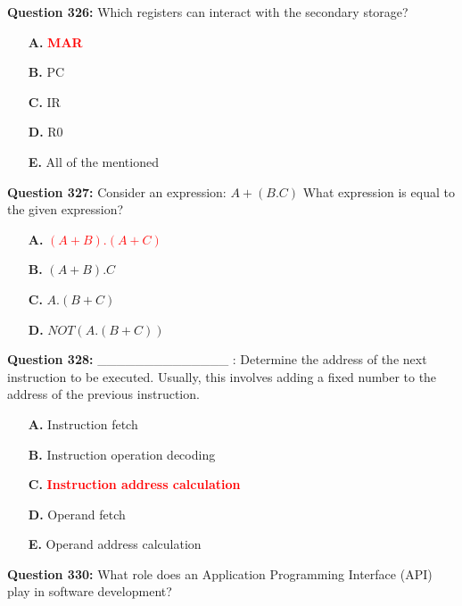 \documentclass[12pt,a4paper]{article}
\begin{document}
\vspace{0.5cm}

\textbf{Question 326:} Which registers can interact with the secondary storage?

\begin{itemize}
    \item[\textbf{A.}] \textcolor{red}{\textbf{MAR}}
    \item[\textbf{B.}] PC
    \item[\textbf{C.}] IR
    \item[\textbf{D.}] R0
    \item[\textbf{E.}] All of the mentioned
\end{itemize}

\vspace{0.5cm}

\textbf{Question 327:} Consider an expression: $A + (B.C)$ What expression is equal to the given expression?

\begin{itemize}
    \item[\textbf{A.}] \textcolor{red}{\textbf{$(A + B).(A + C)$}}
    \item[\textbf{B.}] $(A + B).C$
    \item[\textbf{C.}] $A.(B + C)$
    \item[\textbf{D.}] $NOT(A.(B + C))$
\end{itemize}

\vspace{0.5cm}

\textbf{Question 328:} ______________ : Determine the address of the next instruction to be executed. Usually, this involves adding a fixed number to the address of the previous instruction.

\begin{itemize}
    \item[\textbf{A.}] Instruction fetch
    \item[\textbf{B.}] Instruction operation decoding
    \item[\textbf{C.}] \textcolor{red}{\textbf{Instruction address calculation}}
    \item[\textbf{D.}] Operand fetch
    \item[\textbf{E.}] Operand address calculation
\end{itemize}

\vspace{0.5cm}

\textbf{Question 330:} What role does an Application Programming Interface (API) play in software development?
\end{document}
